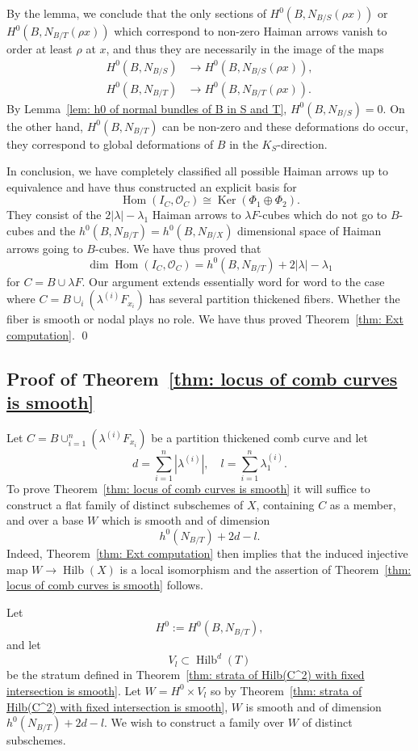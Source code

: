 \documentclass[12pt]{amsart}
\theoremstyle{definition}
\renewcommand{\O}{\mathcal{O}}
\newcommand{\Hom}{\operatorname{Hom}}
\newcommand{\Ker}{\operatorname{Ker}}
\newcommand{\Hilb}{\operatorname{Hilb}}
\begin{document}
By the lemma, we conclude that the only sections of
$H^{0}(B,N_{B/S}(\rho x))$ or $H^{0}(B,N_{B/T}(\rho x))$ which
correspond to non-zero Haiman arrows vanish to order at least $\rho$
at $x$, and thus they are necessarily in the image of the maps
\begin{align*}
H^{0}(B,N_{B/S})&\to H^{0}(B,N_{B/S}(\rho x)),\\
H^{0}(B,N_{B/T})&\to H^{0}(B,N_{B/T}(\rho x)).
\end{align*}
By Lemma~\ref{lem: h0 of normal bundles of B in S and T},
$H^{0}(B,N_{B/S})=0$. On the other hand, $H^{0}(B,N_{B/T})$ can be
non-zero and these deformations do occur, they correspond to global
deformations of $B$ in the $K_{S}$-direction.

In conclusion, we have completely classified all possible Haiman
arrows up to equivalence and have thus constructed an explicit basis
for 
\[
\Hom (I_{C},\O_{C})\cong \Ker (\Phi_{1}\oplus \Phi_{2}).
\]
They consist of the $2|\lambda |-\lambda_{1}$ Haiman arrows to
$\lambda F$-cubes which do not go to $B$-cubes and the
$h^{0}(B,N_{B/T})=h^{0}(B,N_{B/X})$ dimensional space of Haiman arrows
going to $B$-cubes. We have thus proved that
\[
\dim \Hom (I_{C},\O_{C}) = h^{0}(B,N_{B/T}) + 2|\lambda |-\lambda_{1}
\]
for $C=B\cup \lambda F$. Our argument extends essentially word for
word to the case where $C=B\cup_{i}(\lambda^{(i)}F_{x_{i}})$ has
several partition thickened fibers. Whether the fiber is smooth or
nodal plays no role. We have thus proved Theorem~\ref{thm: Ext
computation}. \qed 

\subsection{Proof of Theorem~\ref{thm: locus of comb curves is smooth}}

Let $C=B\cup_{i=1}^{n}\left(\lambda^{(i)}F_{x_{i}} \right)$ be a
partition thickened comb curve and let 
\[
d=\sum_{i=1}^{n} |\lambda^{(i)}|,\quad l=\sum_{i=1}^{n}\lambda_{1}^{(i)}.
\]
To prove Theorem~\ref{thm: locus of comb curves is smooth} it will
suffice to construct a flat family of distinct subschemes of $X$,
containing $C$ as a member, and over a base $W$ which is smooth and of
dimension
\[
h^{0}(N_{B/T}) + 2d - l.
\]
Indeed, Theorem~\ref{thm: Ext computation} then implies that the
induced injective map $W\to \Hilb (X)$ is a local isomorphism and the
assertion of Theorem~\ref{thm: locus of comb curves is smooth}
follows.

Let 
\[
H^{0}:=H^{0}(B,N_{B/T}),
\]
and let 
\[
V_{l}\subset \Hilb^{d}(T)
\]
be the stratum defined in Theorem~\ref{thm: strata of Hilb(C^2) with
fixed intersection is smooth}. Let $W=H^{0}\times V_{l}$ so by
Theorem~\ref{thm: strata of Hilb(C^2) with fixed intersection is
smooth}, $W$ is smooth and of dimension $h^{0}(N_{B/T})+2d-l$. We wish
to construct a family over $W$ of distinct subschemes.
\end{document}
